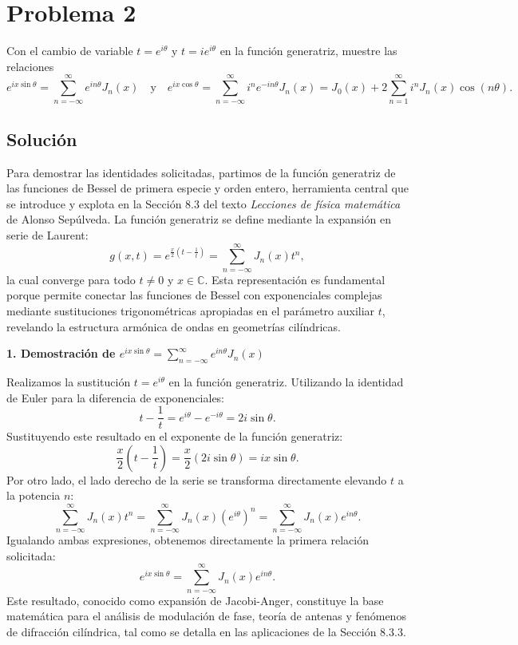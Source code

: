 \documentclass[a4paper]{article}
\begin{document}
\section{Problema 2}
Con el cambio de variable $t= e^{i\theta}$ y $t= i e^{i\theta}$ en la función generatriz, muestre las relaciones
$$e^{ix\sin\theta}= \sum_{n=-\infty}^{\infty} e^{in\theta} J_n(x) \quad \text{y} \quad e^{ix\cos\theta}= \sum_{n=-\infty}^{\infty} i^n e^{-in\theta} J_n(x)= J_0(x)+2 \sum_{n=1}^{\infty} i^n J_n(x) \cos(n\theta).$$

\subsection{Solución}
Para demostrar las identidades solicitadas, partimos de la función generatriz de las funciones de Bessel de primera especie y orden entero, herramienta central que se introduce y explota en la Sección 8.3 del texto \textit{Lecciones de física matemática} de Alonso Sepúlveda. La función generatriz se define mediante la expansión en serie de Laurent:
$$g(x, t) = e^{\frac{x}{2}\left(t - \frac{1}{t}\right)} = \sum_{n=-\infty}^{\infty} J_n(x) t^n,$$
la cual converge para todo $t \neq 0$ y $x \in \mathbb{C}$. Esta representación es fundamental porque permite conectar las funciones de Bessel con exponenciales complejas mediante sustituciones trigonométricas apropiadas en el parámetro auxiliar $t$, revelando la estructura armónica de ondas en geometrías cilíndricas.

\textbf{1. Demostración de $e^{ix\sin\theta}= \sum_{n=-\infty}^{\infty} e^{in\theta} J_n(x)$}

Realizamos la sustitución $t = e^{i\theta}$ en la función generatriz. Utilizando la identidad de Euler para la diferencia de exponenciales:
$$t - \frac{1}{t} = e^{i\theta} - e^{-i\theta} = 2i\sin\theta.$$
Sustituyendo este resultado en el exponente de la función generatriz:
$$\frac{x}{2}\left(t - \frac{1}{t}\right) = \frac{x}{2}(2i\sin\theta) = ix\sin\theta.$$
Por otro lado, el lado derecho de la serie se transforma directamente elevando $t$ a la potencia $n$:
$$\sum_{n=-\infty}^{\infty} J_n(x) t^n = \sum_{n=-\infty}^{\infty} J_n(x) (e^{i\theta})^n = \sum_{n=-\infty}^{\infty} J_n(x) e^{in\theta}.$$
Igualando ambas expresiones, obtenemos directamente la primera relación solicitada:
$$e^{ix\sin\theta} = \sum_{n=-\infty}^{\infty} J_n(x) e^{in\theta}.$$
Este resultado, conocido como expansión de Jacobi-Anger, constituye la base matemática para el análisis de modulación de fase, teoría de antenas y fenómenos de difracción cilíndrica, tal como se detalla en las aplicaciones de la Sección 8.3.3.
\end{document}
